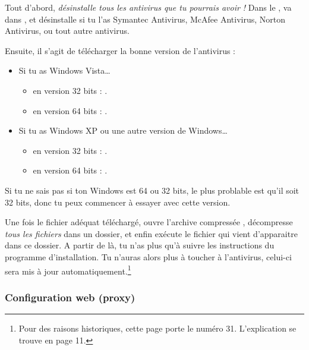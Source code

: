 Tout d'abord, \emph{désinstalle tous les antivirus que tu pourrais
avoir !} Dans le , va dans ,  et
désinstalle si tu l'as Symantec Antivirus, McAfee Antivirus, Norton
Antivirus, ou tout autre antivirus.

Ensuite, il s'agit de télécharger la bonne version de l'antivirus :
\begin{itemize}

\item Si tu as Windows Vista\dots
\begin{itemize}
\item en version 32 bits : .
\item en version 64 bits : .
\end{itemize}

\item Si tu as Windows XP ou une autre version de Windows\dots
\begin{itemize}
\item en version 32 bits : .
\item en version 64 bits : .
\end{itemize}
\end{itemize}

Si tu ne sais pas si ton Windows est 64 ou 32 bits, le plus problable est qu'il
soit 32 bits, donc tu peux commencer à essayer avec cette version.

Une fois le fichier adéquat téléchargé, ouvre l'archive compressée , décompresse \emph{tous les fichiers} dans un dossier, et
enfin exécute le fichier  qui vient d'apparaitre dans ce dossier. A partir de là, tu n'as plus qu'à suivre les instructions du
programme d'installation. Tu n'auras alors plus à toucher à l'antivirus, celui-ci sera mis à jour automatiquement.\footnote{Pour des raisons historiques, cette page porte le numéro 31. L'explication se trouve en page 11.}

\subsubsection{Configuration web (proxy)}


